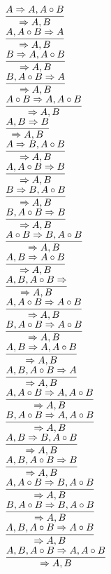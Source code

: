 \documentclass[11pt]{article}
\begin{document}
\begin{center}
\bigskip
\\$\infer{\Rightarrow A, B}{A\Rightarrow A, A\circ B}$
\bigskip
\\$\infer{\Rightarrow A, B}{A, A\circ B\Rightarrow A}$
\bigskip
\\$\infer{\Rightarrow A, B}{B\Rightarrow A, A\circ B}$
\bigskip
\\$\infer{\Rightarrow A, B}{B, A\circ B\Rightarrow A}$
\bigskip
\\$\infer{\Rightarrow A, B}{A\circ B\Rightarrow A, A\circ B}$
\bigskip
\\$\infer{\Rightarrow A, B}{A, B\Rightarrow B}$
\bigskip
\\$\infer{\Rightarrow A, B}{A\Rightarrow B, A\circ B}$
\bigskip
\\$\infer{\Rightarrow A, B}{A, A\circ B\Rightarrow B}$
\bigskip
\\$\infer{\Rightarrow A, B}{B\Rightarrow B, A\circ B}$
\bigskip
\\$\infer{\Rightarrow A, B}{B, A\circ B\Rightarrow B}$
\bigskip
\\$\infer{\Rightarrow A, B}{A\circ B\Rightarrow B, A\circ B}$
\bigskip
\\$\infer{\Rightarrow A, B}{A, B\Rightarrow A\circ B}$
\bigskip
\\$\infer{\Rightarrow A, B}{A, B, A\circ B\Rightarrow }$
\bigskip
\\$\infer{\Rightarrow A, B}{A, A\circ B\Rightarrow A\circ B}$
\bigskip
\\$\infer{\Rightarrow A, B}{B, A\circ B\Rightarrow A\circ B}$
\bigskip
\\$\infer{\Rightarrow A, B}{A, B\Rightarrow A, A\circ B}$
\bigskip
\\$\infer{\Rightarrow A, B}{A, B, A\circ B\Rightarrow A}$
\bigskip
\\$\infer{\Rightarrow A, B}{A, A\circ B\Rightarrow A, A\circ B}$
\bigskip
\\$\infer{\Rightarrow A, B}{B, A\circ B\Rightarrow A, A\circ B}$
\bigskip
\\$\infer{\Rightarrow A, B}{A, B\Rightarrow B, A\circ B}$
\bigskip
\\$\infer{\Rightarrow A, B}{A, B, A\circ B\Rightarrow B}$
\bigskip
\\$\infer{\Rightarrow A, B}{A, A\circ B\Rightarrow B, A\circ B}$
\bigskip
\\$\infer{\Rightarrow A, B}{B, A\circ B\Rightarrow B, A\circ B}$
\bigskip
\\$\infer{\Rightarrow A, B}{A, B, A\circ B\Rightarrow A\circ B}$
\bigskip
\\$\infer{\Rightarrow A, B}{A, B, A\circ B\Rightarrow A, A\circ B}$

\end{center}
\end{document}
